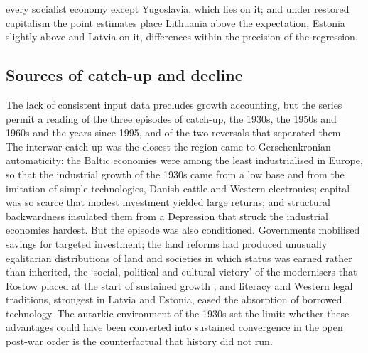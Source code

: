 every socialist economy except Yugoslavia, which lies on it; and under restored capitalism the point estimates place Lithuania above the expectation, Estonia slightly above and Latvia on it, differences within the precision of the regression.

\subsection{Sources of catch-up and decline}

The lack of consistent input data precludes growth accounting, but the series permit a reading of the three episodes of catch-up, the 1930s, the 1950s and 1960s and the years since 1995, and of the two reversals that separated them. The interwar catch-up was the closest the region came to Gerschenkronian automaticity: the Baltic economies were among the least industrialised in Europe, so that the industrial growth of the 1930s came from a low base and from the imitation of simple technologies, Danish cattle and Western electronics; capital was so scarce that modest investment yielded large returns; and structural backwardness insulated them from a Depression that struck the industrial economies hardest. But the episode was also conditioned. Governments mobilised savings for targeted investment; the land reforms had produced unusually egalitarian distributions of land \parencite[48]{koll_1994_peasants} and societies in which status was earned rather than inherited, the `social, political and cultural victory' of the modernisers that Rostow placed at the start of sustained growth \parencite[7]{rostow1959}; and literacy and Western legal traditions, strongest in Latvia and Estonia, eased the absorption of borrowed technology. The autarkic environment of the 1930s set the limit: whether these advantages could have been converted into sustained convergence in the open post-war order is the counterfactual that history did not run.

